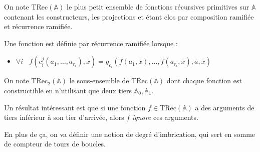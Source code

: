 \documentclass{report}
\newcommand{\bbA}{\mathbb{A}}
\newcommand{\TRec}[1]{\text{TRec}\left(\mathbb{#1}\right)}
\newcommand{\TRecd}[1]{\text{TRec}_{2}\left(\mathbb{#1}\right)}
\begin{document}
		\begin{definition} 
			\label{def:TRecA}
			On note $\TRec{A}$ le plus petit ensemble de fonctions récursives primitives sur $\bbA$ contenant les constructeurs, les projections et étant clos par composition ramifiée et récurrence ramifiée.
			
			
			Une fonction est définie par récurrence ramifiée lorsque :
			
			\begin{itemize}
				\item 	$\forall i \:\:\:\:
				f(c_i^j(a_1, \dots, a_{r_i}), \bar{x}) 
				= g_{c_i}\left( f(a_1, \bar{x}), \dots, f(a_{r_i}, \bar{x}), \bar{a}, \bar{x} \right)
				$
			\end{itemize}
			
			
			On note $\TRecd{A}$ le sous-ensemble de $\TRec{A}$ dont chaque fonction est constructible en n'utilisant que deux tiers $\bbA_0, \bbA_1$.
		\end{definition}
		
		Un résultat intéressant est que si une fonction $f \in \TRec{\bbA}$ a des arguments de tiers inférieur à son tier d'arrivée, alors $f$ \emph{ignore} ces arguments.
		
		\espace 
		
		En plus de ça, on va définir une notion de degré d'imbrication, qui sert en somme de compteur de tours de boucles. 
		
\end{document}
